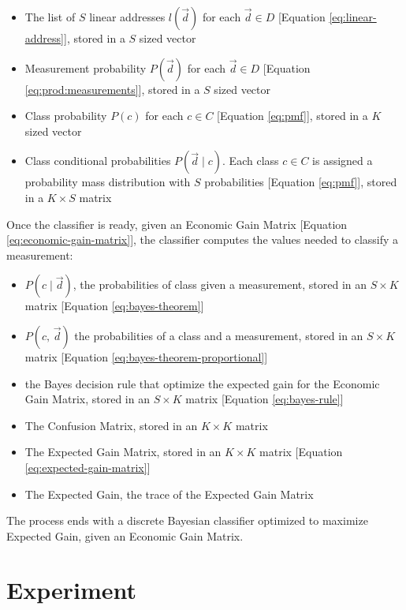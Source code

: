 \documentclass[letterpaper, conference]{IEEEtran}
\begin{document}
\begin{itemize}
  \item The list of $S$ linear addresses $l(\vec{d})$ for each $\vec{d} \in D$ [Equation \ref{eq:linear-address}], stored in a $S$ sized vector
  \item Measurement probability $P(\vec{d})$ for each  $\vec{d} \in D$ [Equation \ref{eq:prod:measurements}], stored in a $S$ sized vector
  \item Class probability $P(c)$ for each  $c \in C$ [Equation \ref{eq:pmf}], stored in a $K$ sized vector
  \item Class conditional probabilities $P(\vec{d} \mid c)$. Each class $c \in C$ is assigned a probability mass distribution with $S$ probabilities [Equation \ref{eq:pmf}], stored in a $K \times S$ matrix
\end{itemize}

Once the classifier is ready, given an Economic Gain Matrix [Equation \ref{eq:economic-gain-matrix}], the classifier computes the values needed to classify a measurement:

\begin{itemize}
  \item $P(c \mid \vec{d})$, the probabilities of class given a measurement, stored in an $S \times K$ matrix [Equation \ref{eq:bayes-theorem}]
  \item $P(c,\, \vec{d})$ the probabilities of a class and a measurement, stored in an $S \times K$ matrix [Equation \ref{eq:bayes-theorem-proportional}]
  \item the Bayes decision rule that optimize the expected gain for the Economic Gain Matrix, stored in an $S \times K$ matrix [Equation \ref{eq:bayes-rule}]
  \item The Confusion Matrix, stored in an $K \times K$ matrix
  \item The Expected Gain Matrix, stored in an $K \times K$ matrix [Equation \ref{eq:expected-gain-matrix}]
  \item The Expected Gain, the trace of the Expected Gain Matrix
\end{itemize}

The process ends with a discrete Bayesian classifier optimized to maximize Expected Gain, given an Economic Gain Matrix.

\section{Experiment}\label{experiment}
\end{document}
